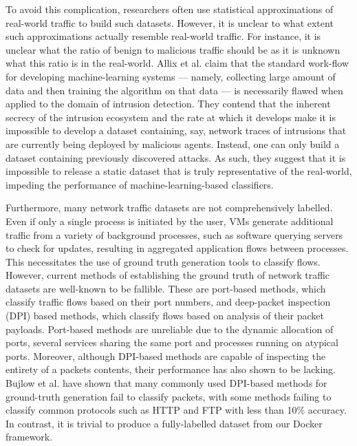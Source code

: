 \documentclass[msc,deptreport, cs]{infthesis} %
\begin{document}
To avoid this complication, researchers often use statistical approximations of real-world traffic to build such datasets. However, it is unclear to what extent such approximations actually resemble real-world traffic. For instance, it is unclear what the ratio of benign to malicious traffic should be as it is unknown what this ratio is in the real-world. Allix et al. \cite{allix2014machine} claim that the standard work-flow for developing machine-learning systems --- namely, collecting large amount of data and then training the algorithm on that data --- is necessarily flawed when applied to the domain of intrusion detection. They contend that the inherent secrecy of the intrusion ecosystem and the rate at which it develops make it is impossible to develop a dataset containing, say, network traces of intrusions that are currently being deployed by malicious agents. Instead, one can only build a dataset containing previously discovered attacks. As such, they suggest that it is impossible to release a static dataset that is truly representative of the real-world, impeding the performance of machine-learning-based classifiers.

Furthermore, many network traffic datasets are not comprehensively labelled. Even if only a single process is initiated by the user, VMs generate additional traffic from a variety of background processes, such as software querying servers to check for updates, resulting in aggregated application flows between processes. This necessitates the use of ground truth generation tools to classify flows. However, current methods of establishing the ground truth of network traffic datasets are well-known to be fallible\cite{carela2014our}. These are port-based methods, which classify traffic flows based on their port numbers, and deep-packet inspection (DPI) based methods, which classify flows based on analysis of their packet payloads. Port-based methods are unreliable due to the dynamic allocation of ports, several services sharing the same port and processes running on atypical ports. Moreover, although DPI-based methods are capable of inspecting the entirety of a packets contents, their performance has also shown to be lacking. Bujlow et al. \cite{bujlow2013comparison} have shown that many commonly used DPI-based methods for ground-truth generation fail to classify packets, with some methods failing to classify common protocols such as HTTP and FTP with less than 10\% accuracy. In contrast, it is trivial to produce a fully-labelled dataset from our Docker framework.
\end{document}
